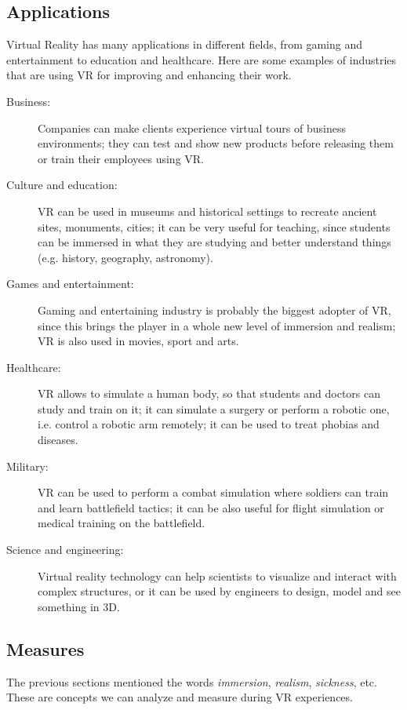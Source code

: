 \documentclass[binding=0.6cm,LaM]{sapthesis}
\begin{document}
\subsection{Applications}
Virtual Reality has many applications in different fields, from gaming and entertainment to education and healthcare. Here are some examples of industries that are using VR for improving and enhancing their work.

\begin{description}

\item[Business:] Companies can make clients experience virtual tours of business environments; they can test and show new products before releasing them or train their employees using VR.

\item[Culture and education:] VR can be used in museums and historical settings to recreate ancient sites, monuments, cities; it can be
very useful for teaching, since students can be immersed in what they are studying and better understand things (e.g. history, geography, astronomy).

\item[Games and entertainment:] Gaming and entertaining industry is probably the biggest adopter of VR, since this brings the player in a whole new level of immersion and realism; VR is also used in movies, sport and arts.

\item[Healthcare:] VR allows to simulate a human body, so that students and doctors can study and train on it; it can simulate a surgery or perform a robotic one, i.e. control a robotic arm remotely; it can be used to treat phobias and diseases.

\item[Military:] VR can be used to perform a combat simulation where soldiers can train and learn battlefield tactics; it can be also useful for flight simulation or medical training on the battlefield.  

\item[Science and engineering:] Virtual reality technology can help scientists to visualize and interact with complex structures, or it can be used by engineers to design, model and see something in 3D. 

\end{description}


\subsection{Measures}
\label{sec:measures}
The previous sections mentioned the words \textit{immersion}, \textit{realism}, \textit{sickness}, etc. These are concepts we can analyze and measure during VR experiences. 
\end{document}
